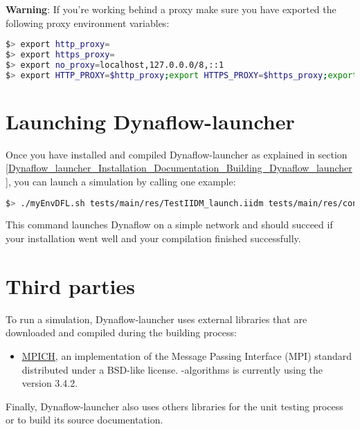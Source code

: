 \documentclass[a4paper, 12pt]{report}
\begin{document}
\textbf{Warning}: If you're working behind a proxy make sure you have exported the following proxy environment variables:

\begin{lstlisting}[language=bash, columns=fullflexible]
$> export http_proxy=
$> export https_proxy=
$> export no_proxy=localhost,127.0.0.0/8,::1
$> export HTTP_PROXY=$http_proxy;export HTTPS_PROXY=$https_proxy;export NO_PROXY=$no_proxy;
\end{lstlisting}

\section[Launching Dynaflow-launcher]{Launching Dynaflow-launcher}

Once you have installed and compiled Dynaflow-launcher as explained in section \ref{Dynaflow_launcher_Installation_Documentation_Building_Dynaflow_launcher},
you can launch a simulation by calling one example:

\begin{lstlisting}[language=bash, breaklines=true, breakatwhitespace=false, columns=fullflexible]
$> ./myEnvDFL.sh tests/main/res/TestIIDM_launch.iidm tests/main/res/config_launch.json
\end{lstlisting}

This command launches Dynaflow on a simple network and should succeed if your installation went well and your compilation finished successfully.

\section{Third parties}

To run a simulation, Dynaflow-launcher uses external libraries that are downloaded and compiled during the building process:
\begin{itemize}
\item \href{https://www.mpich.org/}{\underline{MPICH}}, an implementation of the Message Passing Interface (MPI) standard distributed under a BSD-like license.
\Dynawo-algorithms is currently using the version 3.4.2.
\end{itemize}

Finally, Dynaflow-launcher also uses others libraries for the unit testing process or to build its source documentation.
\end{document}

